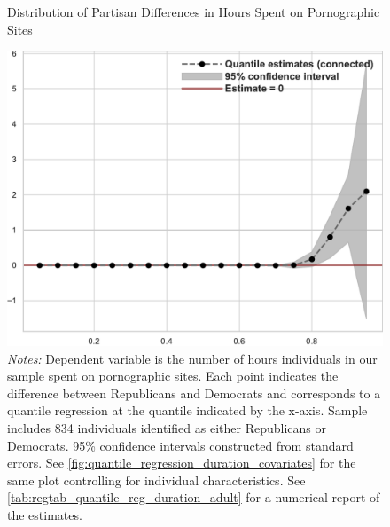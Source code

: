 \documentclass[12pt, letterpaper]{article}
\begin{document}
\begin{figure}[t]
	\centering
	\caption{Distribution of Partisan Differences in Hours Spent on Pornographic Sites}
	\includegraphics[width=.7\linewidth]{../figs/quantile_reg_duration_adult.pdf}
	\caption*{\footnotesize \emph{Notes:} 
		Dependent variable is the number of hours individuals in our sample spent on pornographic sites.
		Each point indicates the difference between Republicans and Democrats and corresponds to a quantile regression at the quantile indicated by the x-axis.
		Sample includes 834 individuals identified as either Republicans or Democrats.
		95\% confidence intervals constructed from standard errors.
		See \cref{fig:quantile_regression_duration_covariates} for the same plot controlling for individual characteristics.
		See \cref{tab:regtab_quantile_reg_duration_adult} for a numerical report of the estimates.
	}
	\label{fig:quantile_regression_duration}
\end{figure}
\end{document}

